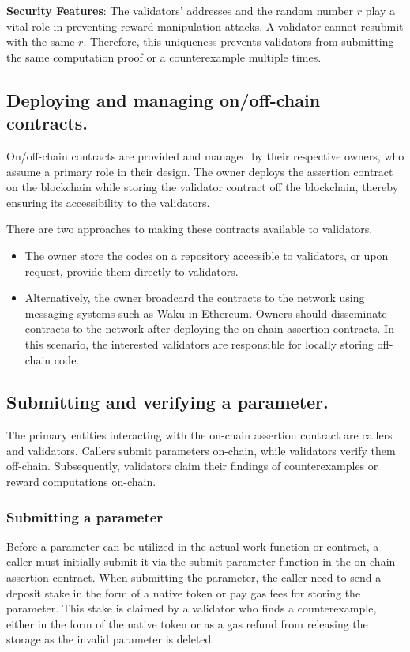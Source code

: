 \documentclass[runningheads]{llncs}
\begin{document}

\textbf{Security Features}:
The validators' addresses and the random number $r$ play a vital role in preventing reward-manipulation attacks. A validator cannot resubmit with the same $r$. Therefore, this uniqueness prevents validators from submitting the same computation proof or a counterexample multiple times.

\subsection{Deploying and managing on/off-chain contracts.}
On/off-chain contracts are provided and managed by their respective owners, who assume a primary role in their design. The owner deploys the assertion contract on the blockchain while storing the validator contract off the blockchain, thereby ensuring its accessibility to the validators.

There are two approaches to making these contracts available to validators.
\begin{itemize}
\item The owner store the codes on a repository accessible to validators, or upon request, provide them directly to validators.
\item Alternatively, the owner broadcard the contracts to the network using messaging systems such as Waku in Ethereum. Owners should disseminate contracts to the network after deploying the on-chain assertion contracts. In this scenario, the interested validators are responsible for locally storing off-chain code.
\end{itemize}

\subsection{Submitting and verifying a parameter.} The primary entities interacting with the on-chain assertion contract are callers and validators. Callers submit parameters on-chain, while validators verify them off-chain. Subsequently, validators claim their findings of counterexamples or reward computations on-chain. 
\subsubsection{Submitting a parameter} 
Before a parameter can be utilized in the actual work function or contract, a caller must initially submit it via the submit-parameter function in the on-chain assertion contract. When submitting the parameter, the caller need to send a deposit stake in the form of a native token or pay gas fees for storing the parameter. This stake is claimed by a validator who finds a counterexample, either in the form of the native token or as a gas refund from releasing the storage as the invalid parameter is deleted.
\end{document}
